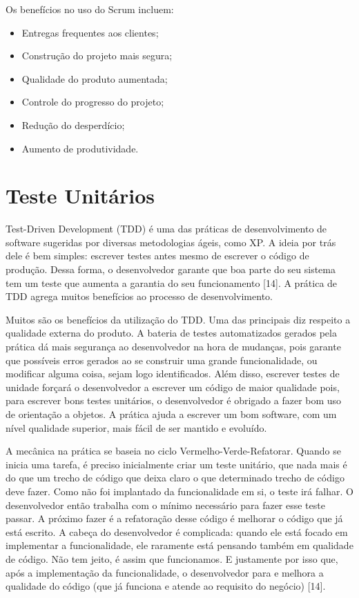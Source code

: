 Os benefícios no uso do Scrum incluem:
\begin{itemize}
    \item Entregas frequentes aos clientes;
    \item Construção do projeto mais segura;
    \item Qualidade do produto aumentada;
    \item Controle do progresso do projeto;
    \item Redução do desperdício;
    \item Aumento de produtividade.
\end{itemize}

\section{Teste Unitários}

Test-Driven Development (TDD) é uma das práticas de desenvolvimento de software sugeridas por diversas metodologias ágeis, como XP. A ideia por trás dele é bem simples: escrever testes antes mesmo de escrever o código de produção. Dessa forma, o desenvolvedor garante que boa parte do seu sistema tem um teste que aumenta a garantia do seu funcionamento [14]. A prática de TDD agrega muitos benefícios ao processo de desenvolvimento.

Muitos são os benefícios da utilização do TDD. Uma das principais diz respeito a qualidade externa do produto. A bateria de testes automatizados gerados pela prática dá mais segurança ao desenvolvedor na hora de mudanças, pois garante que possíveis erros gerados ao se construir uma grande funcionalidade, ou modificar alguma coisa, sejam logo identificados. Além disso, escrever testes de unidade forçará o desenvolvedor a escrever um código de maior qualidade pois, para escrever bons testes unitários, o desenvolvedor é obrigado a fazer bom uso de orientação a objetos. A prática ajuda a escrever um bom software, com um nível qualidade superior, mais fácil de ser mantido e evoluído.

A mecânica na prática se baseia no ciclo Vermelho-Verde-Refatorar. Quando se inicia uma tarefa, é preciso inicialmente criar um teste unitário, que nada mais é do que um trecho de código que deixa claro o que determinado trecho de código deve fazer. Como não foi implantado da funcionalidade em si, o teste irá falhar. O desenvolvedor então trabalha com o mínimo necessário para fazer esse teste passar. A próximo fazer é a refatoração desse código é melhorar o código que já está escrito. A cabeça do desenvolvedor é complicada: quando ele está focado em implementar a funcionalidade, ele raramente está pensando também em qualidade de código. Não tem jeito, é assim que funcionamos. E justamente por isso que, após a implementação da funcionalidade, o desenvolvedor para e melhora a qualidade do código (que já funciona e atende ao requisito do negócio) [14].

